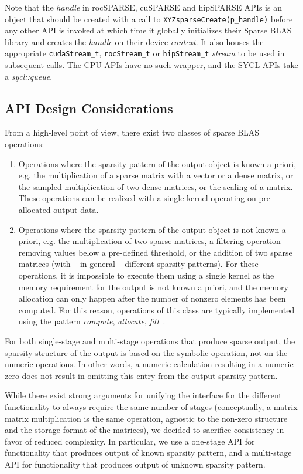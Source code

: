 \documentclass{article}
\begin{document}
Note that the \textit{handle} in rocSPARSE, cuSPARSE and hipSPARSE APIs is an object that should be created with a call to \verb|XYZsparseCreate(p_handle)| before any other API is invoked at which time it globally initializes their Sparse BLAS library and creates the \textit{handle} on their device \textit{context}. It also houses the appropriate \verb|cudaStream_t|, \verb|rocStream_t| or \verb|hipStream_t| \textit{stream} to be used in subsequent calls.  The CPU APIs have no such wrapper, and the SYCL APIs take a \textit{sycl::queue}.

\subsection{API Design Considerations}
From a high-level point of view, there exist two classes of sparse BLAS operations:
\begin{enumerate}
    \item Operations where the sparsity pattern of the output object is known a priori, e.g. the multiplication of a sparse matrix with a vector or a dense matrix, or the sampled multiplication of two dense matrices, or the scaling of a matrix. These operations can be realized with a single kernel operating on pre-allocated output data.
    \item Operations where the sparsity pattern of the output object is not known a priori, e.g. the multiplication of two sparse matrices, a filtering operation removing values below a pre-defined threshold, or the addition of two sparse matrices (with -- in general -- different sparsity patterns).
    For these operations, it is impossible to execute them using a single kernel as the memory requirement for the output is not known a priori, and the memory allocation can only happen after the number of nonzero elements has been computed. For this reason, operations of this class are typically implemented using the pattern \textit{compute}, \textit{allocate}, \textit{fill}~\cite{10.1145/275323.275327}.
\end{enumerate} 

For both single-stage and multi-stage operations that produce sparse output, the sparsity structure of the output is based on the symbolic operation, not on the numeric operations. In other words, a numeric calculation resulting in a numeric zero does not result in omitting this entry from the output sparsity pattern.


While there exist strong arguments for unifying the interface for the different functionality to always require the same number of stages (conceptually, a matrix matrix multiplication is the same operation, agnostic to the non-zero structure and the storage format of the matrices), we decided to sacrifice consistency in favor of reduced complexity. In particular, we use a one-stage API for functionality that produces output of known sparsity pattern, and a multi-stage API for functionality that produces output of unknown sparsity pattern. 
\end{document}
